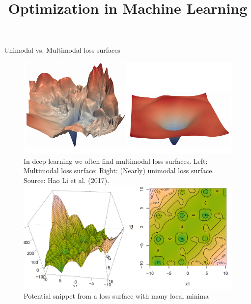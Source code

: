 \documentclass[11pt,compress,t,notes=noshow, xcolor=table]{beamer}
\title{Optimization in Machine Learning}
\date{}
\begin{document}
\sloppy

\begin{vbframe}{Unimodal vs. Multimodal loss surfaces}
\begin{figure}
\centering
\includegraphics[width=12cm]{figure_man/difficult_vs_easy.png}
\footnotesize{In deep learning we often find multimodal loss surfaces. Left: Multimodal loss surface; Right: (Nearly) unimodal loss surface. Source: Hao Li et al. (2017). }
\centering
\vspace{1cm}
\includegraphics[width=.9\textwidth]{figure_man/multimodal.png}
\footnotesize{Potential snippet from a loss surface with many local minima}
\end{figure}

\end{vbframe}

\end{document}
